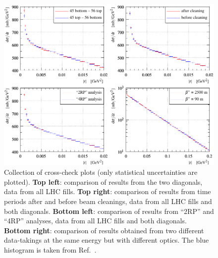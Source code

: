 \begin{figure}
\vskip-5mm
\begin{center}
\includegraphics{fig/t_dist_cross_checks.pdf}
\caption{%
Collection of cross-check plots (only statistical uncertainties are plotted).
{\bf Top left}: comparison of results from the two diagonals, data from all LHC fills.
{\bf Top right}: comparison of results from time periods after and before beam cleanings, data from all LHC fills and both diagonals.
{\bf Bottom left}: comparison of results from ``2RP'' and ``4RP'' analyses, data from all LHC fills and both diagonals.
{\bf Bottom right}: comparison of results obtained from two different data-takings at the same energy but with different optics. The blue histogram is taken from Ref.~\cite{totem-13tev-90m}.
}
\label{fig:dsdt checks}
\end{center}
\end{figure}



